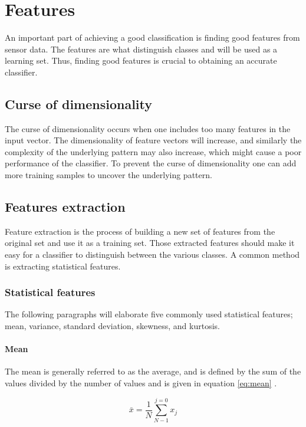 \documentclass[USenglish]{ifimaster}  %
\begin{document}
\section{Features} \label{features}
An important part of achieving a good classification is finding good features from sensor data. The features are what distinguish classes and will be used as a learning set. Thus, finding good features is crucial to obtaining an accurate classifier.
	
\subsection{Curse of dimensionality}\label{curseDim}
The curse of dimensionality occurs when one includes too many features in the input vector. The dimensionality of feature vectors will increase, and similarly the complexity of the underlying pattern may also increase, which might cause a poor performance of the classifier. To prevent the curse of dimensionality one can add more training samples to uncover the underlying pattern.

	
\subsection{Features extraction} \label{feature_extraction}
Feature extraction is the process of building a new set of features from the original set and use it as a training set. Those extracted features should make it easy for a classifier to distinguish between the various classes. A common method is extracting statistical features.

\subsubsection{Statistical features} \label{sub:statical}
The following paragraphs will elaborate five commonly used statistical features; mean, variance, standard deviation, skewness, and kurtosis.
	
\paragraph{Mean}
The mean is generally referred to as the average, and is defined by the sum of the values divided by the number of values and is given in equation \ref{eq:mean} \cite{Press:2007:NRE:1403886}.
	
\begin{equation}
\bar{x} = \frac{1}{N}\sum_{N-1}^{j=0}x_{j}
\label{eq:mean}
\end{equation}
	
\end{document}
